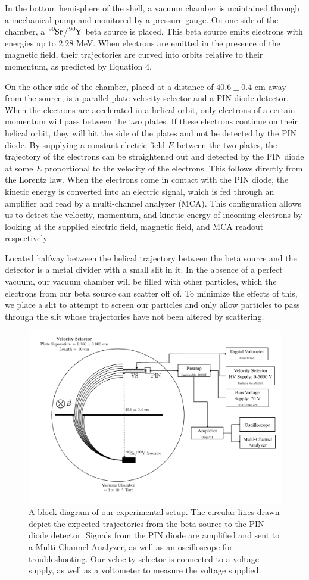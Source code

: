 In the bottom hemisphere of the shell, a vacuum chamber is maintained through a mechanical pump and monitored by a pressure gauge. On one side of the chamber, a $\tensor*[^{90}]{\text{Sr}}{}$/$\tensor*[^{90}]{\text{Y}}{}$ beta source is placed. This beta source emits electrons with energies up to $2.28$ MeV. When electrons are emitted in the presence of the magnetic field, their trajectories are curved into orbits relative to their momentum, as predicted by Equation 4.

On the other side of the chamber, placed at a distance of $40.6 \pm 0.4$ cm away from the source, is a parallel-plate velocity selector and a PIN diode detector. When the electrons are accelerated in a helical orbit, only electrons of a certain momentum will pass between the two plates. If these electrons continue on their helical orbit, they will hit the side of the plates and not be detected by the PIN diode. By supplying a constant electric field $E$ between the two plates, the trajectory of the electrons can be straightened out and detected by the PIN diode at some $E$ proportional to the velocity of the electrons. This follows directly from the Lorentz law. When the electrons come in contact with the PIN diode, the kinetic energy is converted into an electric signal, which is fed through an amplifier and read by a multi-channel analyzer (MCA). This configuration allows us to detect the velocity, momentum, and kinetic energy of incoming electrons by looking at the supplied electric field, magnetic field, and MCA readout respectively.

Located halfway between the helical trajectory between the beta source and the detector is a metal divider with a small slit in it. In the absence of a perfect vacuum, our vacuum chamber will be filled with other particles, which the electrons from our beta source can scatter off of. To minimize the effects of this, we place a slit to attempt to screen our particles and only allow particles to pass through the slit whose trajectories have not been altered by scattering.

\begin{figure}[h]
  \includegraphics[width=.5\textwidth]{setup.png}
  \caption{A block diagram of our experimental setup. The circular lines drawn depict the expected trajectories from the beta source to the PIN diode detector. Signals from the PIN diode are amplified and sent to a Multi-Channel Analyzer, as well as an oscilloscope for troubleshooting. Our velocity selector is connected to a voltage supply, as well as a voltometer to measure the voltage supplied.
\cite{emanual}}
  \label{diagram}
\end{figure}

